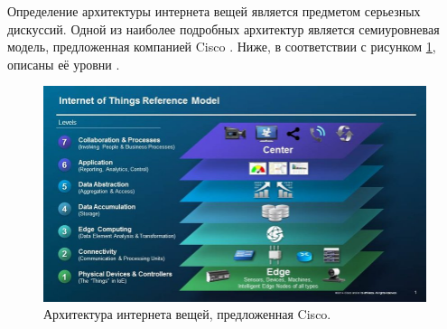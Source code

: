 Определение архитектуры интернета вещей является предметом серьезных дискуссий. 
Одной из наиболее подробных архитектур является семиуровневая модель, предложенная компанией Cisco \cite{Cisco}. Ниже, в соответствии с рисунком \ref{fig:architecture}, описаны её уровни \cite{Cisco_architecture_big} \cite{Cisco_architecture_small}.

\begin{figure}[h]
	\centering
	\includegraphics[width=\textwidth ]{img/Illustration-of-the-IoT-Reference-Model-by-Cisco-1.png}
	\caption{Архитектура интернета вещей, предложенная Cisco.}
	\label{fig:architecture}
\end{figure} 

